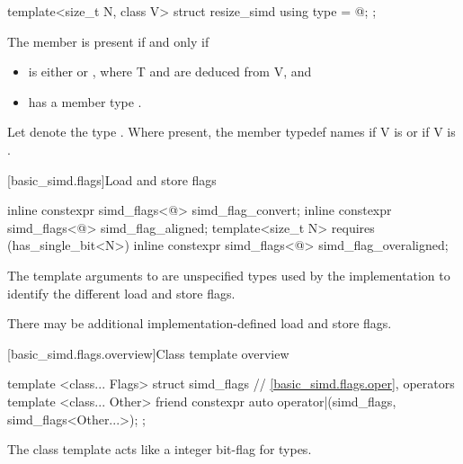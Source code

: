 \begin{itemdecl}
template<size_t N, class V> struct resize_simd { using type = @\seebelow@; };
\end{itemdecl}

\begin{itemdescr}
  \pnum
  The member  is present if and only if
  \begin{itemize}
    \item {} is either  or , where \tcode T and  are deduced from \tcode V, and
    \item {} has a member type .
  \end{itemize}

  \pnum
  Let  denote the type .
  Where present, the member typedef  names  if \tcode V is  or  if \tcode V is .
\end{itemdescr}

[basic_simd.flags]{Load and store flags}

\begin{itemdecl}
inline constexpr simd_flags<@\seebelow@> simd_flag_convert{};
inline constexpr simd_flags<@\seebelow@> simd_flag_aligned{};
template<size_t N> requires (has_single_bit<N>)
  inline constexpr simd_flags<@\seebelow@> simd_flag_overaligned{};
\end{itemdecl}

\begin{itemdescr}
  \pnum
  The template arguments to  are unspecified types used
  by the implementation to identify the different load and store flags.

  \pnum
  There may be additional implementation-defined load and store flags.
\end{itemdescr}

[basic_simd.flags.overview]{Class template  overview}

\begin{codeblock}
template <class... Flags> struct simd_flags {
  // \ref{basic_simd.flags.oper},  operators
  template <class... Other>
    friend constexpr auto operator|(simd_flags, simd_flags<Other...>);
};
\end{codeblock}

\pnum
The class template  acts like a integer bit-flag for types.

